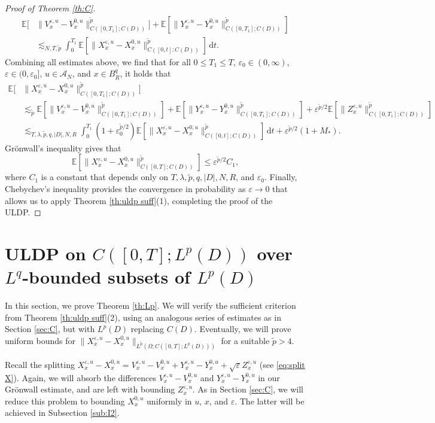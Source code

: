 \documentclass[10pt,a4paper]{amsart}
\numberwithin{equation}{section}
\newcommand{\Cper}{C(D)}
\newcommand{\E}{{\mathbb E}}
\newcommand{\eps}{\varepsilon}
\newcommand{\Om}{\Omega}
\newcommand{\A}{{\mathcal A}}
\newcommand{\dd}{\,\mathrm{d}}
\begin{document}
\begin{proof}[Proof of Theorem \ref{th:C}]
\begin{align*}
\E[&\|V_x^{\eps,u}-V_x^{0,u}\|_{C([0,T_1];\Cper)}^{\tilde p}]+
\E[\|Y_x^{\eps,u}-Y_x^{0,u}\|_{C([0,T_1];\Cper)}^{\tilde p}]\\
&\lesssim_{N,T,\tilde p}
\int_0^{T_1}\E[\|X_x^{\eps,u}-X_x^{0,u}\|_{C([0,t];\Cper)}^{\tilde p}]\dd t.
\end{align*}
Combining all estimates above, we find that for all $0\leq T_1\leq T$,   $\eps_0\in(0,\infty)$, $\eps\in(0,\eps_0]$, $u\in\A_N$, and $x\in B_R^q$, it holds that
\begin{align*}
\E[&\|X_x^{\eps,u}-X_x^{0,u}\|_{C([0,T_1];\Cper)}^{\tilde p}] \\&\lesssim_{\tilde p}\E[\|V_x^{\eps,u}-V_x^{0,u}\|_{C([0,T_1];\Cper)}^{\tilde p}] + \E[\|Y_x^{\eps,u}-Y_x^{0,u}\|_{C([0,T_1];\Cper)}^{\tilde p}] + \eps^{\tilde p/2}\E[\|Z_x^{\eps,u}\|_{C([0,T_1];\Cper)}^{\tilde p}] \\ &\lesssim_{T,\lambda,\tilde p,q,|D|, N,R}\int_0^{T_1} (1+\eps_0^{\tilde p/2})\E[\|X_x^{\eps,u}-X_x^{0,u}\|_{C([0,t];\Cper)}^{\tilde p}]\dd t+\eps^{\tilde p/2}(1+M_*). 
\end{align*} 
Gr\"onwall's inequality gives that 
\[
\E[\|X_x^{\eps,u}-X_x^{0,u}\|_{C([0,T];\Cper)}^{\tilde p}]\leq \eps^{\tilde p/2}C_1,
\]
where $C_1$ is a constant that depends only on $T,\lambda,\tilde p,q,|D|, N,R$, and $\eps_0$. Finally,  Chebychev's inequality provides the convergence in probability as $\eps\to 0$ that allows us to apply Theorem \ref{th:uldp suff}(1), completing the proof of the ULDP. 
\end{proof}



\section{ULDP on $C([0,T];L^p(D))$ over $L^q$-bounded subsets of $L^p(D)$}\label{sec:Lp}

In this section, we prove Theorem \ref{th:Lp}.  We will verify the sufficient criterion from Theorem \ref{th:uldp suff}(2), using an analogous series of estimates as in Section \ref{sec:C}, but with $L^p(D)$ replacing $C(D)$. Eventually, we will prove  uniform bounds for $ \| X_x^{\eps,u} - X_x^{0,u} \|_{L^{\tilde p}(\Om;C([0,T];L^{p}(D)))}$ for a suitable ${\tilde p}>4$. 

Recall the splitting  $X_x^{\eps,u}-X_x^{0,u}=V_x^{\eps,u}-V_x^{0,u}+Y_x^{\eps,u}-Y_x^{0,u}+\sqrt{\eps}Z_x^{\eps,u}$ (see \eqref{eq:split X}). 
Again, we will absorb the differences $V_x^{\eps,u}-V_x^{0,u}$ and $Y_x^{\eps,u}-Y_x^{0,u}$ in our Gr\"onwall estimate, and are left with bounding $Z_x^{\eps,u}$. As in Section \ref{sec:C}, we will reduce this problem to bounding $X_x^{0,u}$ uniformly in $u$, $x$, and $\eps$. The latter will be achieved in Subsection \ref{sub:I2}. 
\end{document}
